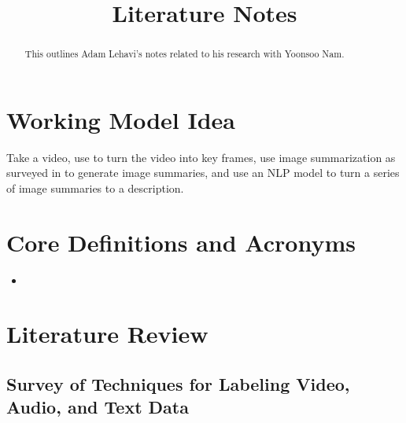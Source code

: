 \documentclass[conference]{IEEEtran}
\begin{document}
\title{Literature Notes}

\author{
}

\maketitle

\begin{abstract}
This outlines Adam Lehavi's notes related to his research with Yoonsoo Nam.
\end{abstract}

\section{Working Model Idea}
Take a video, use \cite{4604096} to turn the video into key frames, use image summarization as surveyed in \cite{bernardi2016automatic} to generate image summaries, and use an NLP model to turn a series of image summaries to a description.

\section{Core Definitions and Acronyms}
\begin{itemize}
    \item 
\end{itemize}

\section{Literature Review}
\subsection{Survey of Techniques for Labeling Video, Audio, and Text Data}
\end{document}
